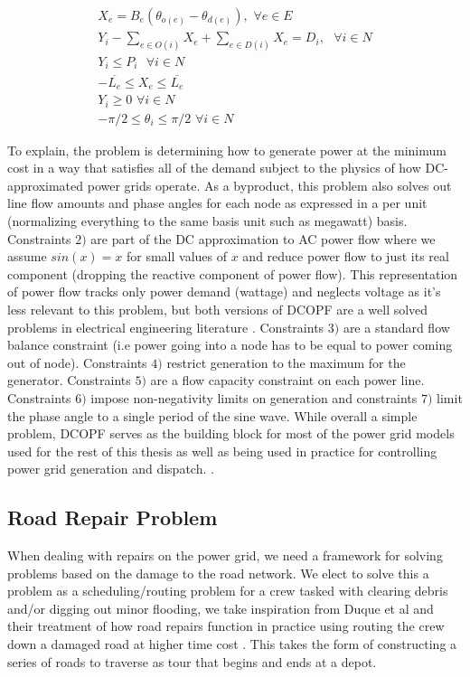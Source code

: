 \documentclass{article}
\begin{document}
	\begin{eqnarray}
	X_e = B_e (\theta_{o(e)} - \theta_{d(e)}), \hspace{4pt} \forall e \in E\\
	Y_i - \sum_{e \in O(i)} X_e + \sum_{e \in D(i)} X_e = D_i, \hspace{4pt} \hspace{4pt} \forall i \in N\\
	  Y_i \leq P_{i} \hspace{4pt} \hspace{4pt} \forall i \in N	\\ 
	  -\overline{L_e} \leq X_e \leq \overline{L_e}\\
	  Y_i \geq 0 \hspace{4pt} \forall i \in N\\
	  -\pi/2 \leq \theta_i \leq \pi/2 \hspace{4pt} \forall i \in N
\end{eqnarray}

To explain, the problem is determining how to generate power at the minimum cost in a way that satisfies all of the demand subject to the physics of how DC-approximated power grids operate. As a byproduct, this problem also solves out line flow amounts and phase angles for each node as expressed in a per unit (normalizing everything to the same basis unit such as megawatt) basis. Constraints $2)$ are part of the DC approximation to AC power flow where we assume $sin(x) = x$ for small values of $x$ and reduce power flow to just its real component (dropping the reactive component of power flow). This representation of power flow tracks only power demand (wattage) and neglects voltage as it's less relevant to this problem, but both versions of DCOPF are a well solved problems in electrical engineering literature \cite{EldridgeEA2017} \cite{ZhangChow2015}. Constraints $3)$ are a standard flow balance constraint (i.e power going into a node has to be equal to power coming out of node). Constraints $4)$ restrict generation to the maximum for the generator. Constraints $5)$ are a flow capacity constraint on each power line. Constraints $6)$ impose non-negativity limits on generation and constraints $7)$ limit the phase angle to a single period of the sine wave. While overall a simple problem, DCOPF serves as the building block for most of the power grid models used for the rest of this thesis as well as being used in practice for controlling power grid generation and dispatch. \cite{LiBo2007}. 
	
	
	\subsection{Road Repair Problem}
	When dealing with repairs on the power grid, we need a framework for solving problems based on the damage to the road network. We elect to solve this a problem as a scheduling/routing problem for a crew tasked with clearing debris and/or digging out minor flooding, we take inspiration from Duque et al \cite{DuqueEA2016} and their treatment of how road repairs function in practice using routing the crew down a damaged road at higher time cost . This takes the form of constructing a series of roads to traverse as tour that begins and ends at a depot.
	
\end{document}
